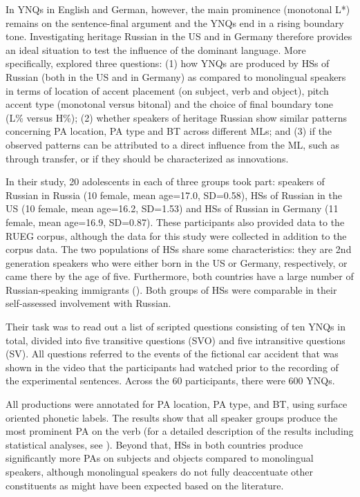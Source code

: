 \documentclass[output=paper,colorlinks,citecolor=brown]{langscibook}
\begin{document}
In YNQs in English and German, however, the main prominence (monotonal L*) remains on the sentence-final argument and the YNQs end in a rising boundary tone. Investigating heritage Russian in the US and in Germany therefore provides an ideal situation to test the influence of the dominant language. More specifically, \citet{Zuban_Rathcke_Zerbian_2023} explored three questions: (1) how YNQs are produced by HSs of Russian (both in the US and in Germany) as compared to monolingual speakers in terms of location of accent placement (on subject, verb and object), pitch accent type (monotonal versus bitonal) and the choice of final boundary tone (L\% versus H\%); (2) whether speakers of heritage Russian show similar patterns concerning PA location, PA type and BT across different MLs; and (3) if the observed patterns can be attributed to a direct influence from the ML, such as through transfer, or if they should be characterized as innovations.

In their study, 20 adolescents in each of three groups took part: speakers of Russian in Russia (10 female, mean age=17.0, SD=0.58), HSs of Russian in the US (10 female, mean age=16.2, SD=1.53) and HSs of Russian in Germany (11 female, mean age=16.9, SD=0.87). These participants also provided data to the RUEG corpus, although the data for this study were collected in addition to the corpus data. The two populations of HSs share some characteristics: they are 2nd generation speakers who were either born in the US or Germany, respectively, or came there by the age of five. Furthermore, both countries have a large number of Russian-speaking immigrants (\cite{UnitedStatesCensusBureau_2009, StatistischesBundesamt_2022}). Both groups of HSs were comparable in their self-assessed involvement with Russian.

Their task was to read out a list of scripted questions consisting of ten YNQs in total, divided into five transitive questions (SVO) and five intransitive questions (SV). All questions referred to the events of the fictional car accident that was shown in the video that the participants had watched prior to the recording of the experimental sentences. Across the 60 participants, there were 600 YNQs.

All productions were annotated for PA location, PA type, and BT, using surface oriented phonetic labels. The results show that all speaker groups produce the most prominent PA on the verb (for a detailed description of the results including statistical analyses, see \cite{Zuban_Rathcke_Zerbian_2023}). Beyond that, HSs in both countries produce significantly more PAs on subjects and objects compared to monolingual speakers, although monolingual speakers do not fully deaccentuate other constituents as might have been expected based on the literature.
\end{document}
